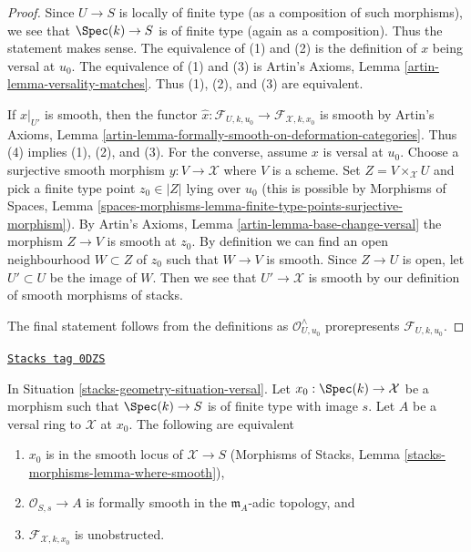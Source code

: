 \begin{proof}
Since $U \to S$ is locally of finite type (as a composition of such morphisms),
we see that $\Spec(k) \to S$ is of finite type (again as a composition).
Thus the statement makes sense. The equivalence of (1) and (2)
is the definition of $x$ being versal at $u_0$.
The equivalence of (1) and (3) is
Artin's Axioms, Lemma \ref{artin-lemma-versality-matches}.
Thus (1), (2), and (3) are equivalent.

\medskip\noindent
If $x|_{U'}$ is smooth, then the functor
$\hat x : \mathcal{F}_{U, k, u_0} \to \mathcal{F}_{\mathcal{X}, k, x_0}$
is smooth by Artin's Axioms, Lemma
\ref{artin-lemma-formally-smooth-on-deformation-categories}.
Thus (4) implies (1), (2), and (3).
For the converse, assume $x$ is versal at $u_0$.
Choose a surjective smooth morphism $y : V \to \mathcal{X}$ where $V$
is a scheme. Set $Z = V \times_\mathcal{X} U$ and pick a finite type
point $z_0 \in |Z|$ lying over $u_0$ (this is possible by
Morphisms of Spaces, Lemma
\ref{spaces-morphisms-lemma-finite-type-points-surjective-morphism}).
By Artin's Axioms, Lemma \ref{artin-lemma-base-change-versal}
the morphism $Z \to V$ is smooth at $z_0$.
By definition we can find an open neighbourhood $W \subset Z$
of $z_0$ such that $W \to V$ is smooth. Since $Z \to U$ is open,
let $U' \subset U$ be the image of $W$. Then we see that
$U' \to \mathcal{X}$ is smooth by our definition of smooth morphisms
of stacks.

\medskip\noindent
The final statement follows from the definitions as
$\mathcal{O}_{U, u_0}^\wedge$
prorepresents $\mathcal{F}_{U, k, u_0}$.
\end{proof}

\begin{lemma}
\label{stacks-geometry-lemma-characterize-smoothness}
\href{https://stacks.math.columbia.edu/tag/0DZS}{\texttt{Stacks tag 0DZS}}

In Situation \ref{stacks-geometry-situation-versal}. Let $x_0 : \Spec(k) \to \mathcal{X}$
be a morphism such that $\Spec(k) \to S$ is of finite type with image $s$.
Let $A$ be a versal ring to $\mathcal{X}$ at $x_0$. The following
are equivalent
\begin{enumerate}
\item $x_0$ is in the smooth locus of $\mathcal{X} \to S$
(Morphisms of Stacks, Lemma \ref{stacks-morphisms-lemma-where-smooth}),
\item $\mathcal{O}_{S, s} \to A$ is formally smooth in the
$\mathfrak m_A$-adic topology, and
\item $\mathcal{F}_{\mathcal{X}, k, x_0}$ is unobstructed.
\end{enumerate}
\end{lemma}

